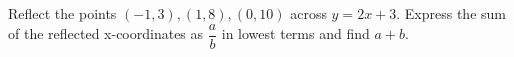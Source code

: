 Reflect the points $(-1,3),(1,8),(0,10)$ across $y=2x+3$. Express the sum of the reflected x-coordinates as $\dfrac{a}{b}$ in lowest terms and find $a+b$.
